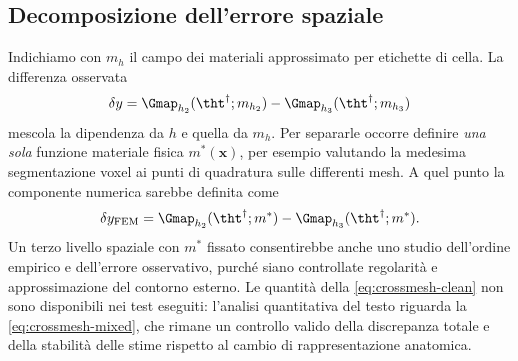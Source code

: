 \subsection*{Decomposizione dell'errore spaziale}
Indichiamo con $m_{h}$ il campo dei materiali approssimato per etichette di cella. La differenza osservata
\begin{equation}\label{eq:crossmesh-mixed}
\delta y=\Gmap_{h_2}(\tht^\dagger;m_{h_2})-
\Gmap_{h_3}(\tht^\dagger;m_{h_3})
\end{equation}
mescola la dipendenza da $h$ e quella da $m_h$. Per separarle occorre definire \emph{una sola} funzione materiale fisica $m^*(\mathbf x)$, per esempio valutando la medesima segmentazione voxel ai punti di quadratura sulle differenti mesh. A quel punto la componente numerica sarebbe definita come
\begin{equation}\label{eq:crossmesh-clean}
\delta y_{\rm FEM}=\Gmap_{h_2}(\tht^\dagger;m^*)-
\Gmap_{h_3}(\tht^\dagger;m^*).
\end{equation}
Un terzo livello spaziale con $m^*$ fissato consentirebbe anche uno studio dell'ordine empirico e dell'errore osservativo, purch\'e siano controllate regolarit\`a e approssimazione del contorno esterno. Le quantit\`a della \eqref{eq:crossmesh-clean} non sono disponibili nei test eseguiti: l'analisi quantitativa del testo riguarda la \eqref{eq:crossmesh-mixed}, che rimane un controllo valido della discrepanza totale e della stabilit\`a delle stime rispetto al cambio di rappresentazione anatomica.
